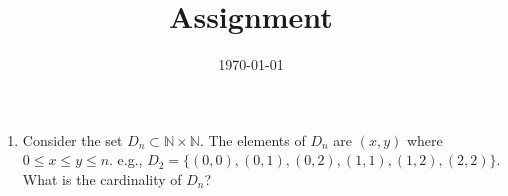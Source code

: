 \documentclass[12pt]{amsart}
\title{Assignment}
\date{\today}
\begin{document}
\maketitle
\begin{enumerate}
\item Consider the set $D_n \subset \mathbb{N} \times \mathbb{N}$. The elements of $D_n$ are $(x,y)$ where $0 \leq x \leq y \leq n$. e.g., $D_2 =  \{ (0,0), (0,1), (0,2), (1,1), (1,2), (2,2)\}$. What is the cardinality of $D_n$?
\end{enumerate}
\end{document}
